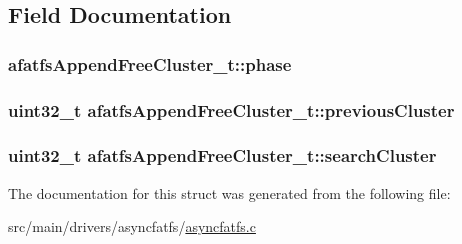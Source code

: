 \subsection{Field Documentation}
\hypertarget{structafatfsAppendFreeCluster__t_ac465900d9a2fdbc1eb668bf3fd86ee21}{
\subsubsection[{phase}]{ afatfs\+Append\+Free\+Cluster\+\_\+t\+::phase}}\label{structafatfsAppendFreeCluster__t_ac465900d9a2fdbc1eb668bf3fd86ee21}
\hypertarget{structafatfsAppendFreeCluster__t_aa7b1aa19502059e683f0c11d23029ea1}{
\subsubsection[{previous\+Cluster}]{\setlength{\rightskip}{0pt plus 5cm}uint32\+\_\+t afatfs\+Append\+Free\+Cluster\+\_\+t\+::previous\+Cluster}}\label{structafatfsAppendFreeCluster__t_aa7b1aa19502059e683f0c11d23029ea1}
\hypertarget{structafatfsAppendFreeCluster__t_ac2acf292e95aa0c3f03bd3577442cedd}{
\subsubsection[{search\+Cluster}]{\setlength{\rightskip}{0pt plus 5cm}uint32\+\_\+t afatfs\+Append\+Free\+Cluster\+\_\+t\+::search\+Cluster}}\label{structafatfsAppendFreeCluster__t_ac2acf292e95aa0c3f03bd3577442cedd}


The documentation for this struct was generated from the following file\+:\begin{DoxyCompactItemize}
\item 
src/main/drivers/asyncfatfs/\hyperlink{asyncfatfs_8c}{asyncfatfs.\+c}\end{DoxyCompactItemize}
